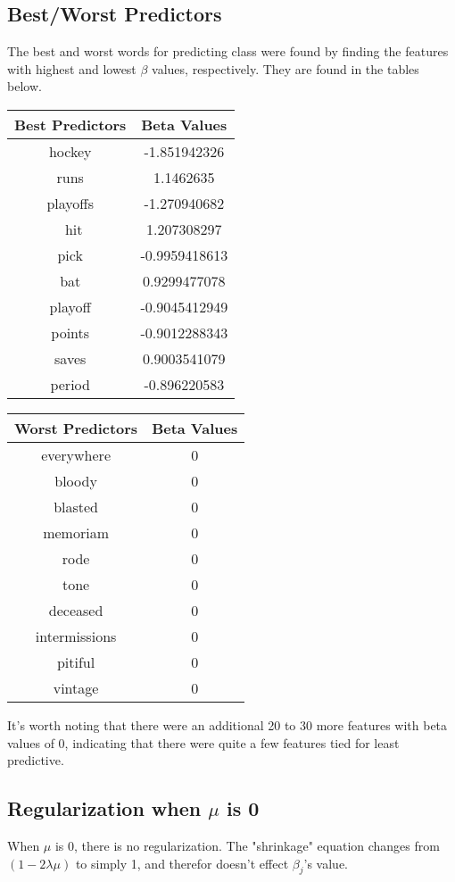 \documentclass{article}
\begin{document}
\subsection{Best/Worst Predictors}
The best and worst words for predicting class were found by finding the features with highest and lowest $\beta$ values, respectively. They are found in the tables below. 

\begin{center}
\begin{tabular}{ |c|c| }
 \hline
 Best Predictors & Beta Values \\ 
 \hline
 hockey & -1.851942326 \\
 runs & 1.1462635 \\
 playoffs & -1.270940682 \\\
 hit & 1.207308297 \\
 pick & -0.9959418613 \\
 bat & 0.9299477078 \\
 playoff & -0.9045412949 \\
 points & -0.9012288343 \\
 saves & 0.9003541079 \\
 period & -0.896220583 \\
 \hline
\end{tabular}
\end{center}

\begin{center}
\begin{tabular}{ |c|c| }
 \hline
 Worst Predictors & Beta Values \\ 
 \hline
 everywhere & 0 \\
 bloody & 0 \\
 blasted & 0 \\
 memoriam & 0 \\
 rode & 0 \\
 tone & 0 \\
 deceased & 0 \\
 intermissions & 0 \\
 pitiful & 0 \\
 vintage & 0 \\
 \hline
\end{tabular}
\end{center}

It's worth noting that there were an additional 20 to 30 more features with beta values of 0, indicating that there were quite a few features tied for least predictive. 

\subsection{Regularization when $\mu$ is 0}
When $\mu$ is 0, there is no regularization. The "shrinkage" equation changes from $(1-2\lambda\mu)$ to simply 1, and therefor doesn't effect $\beta_j$'s value. 
\end{document}
